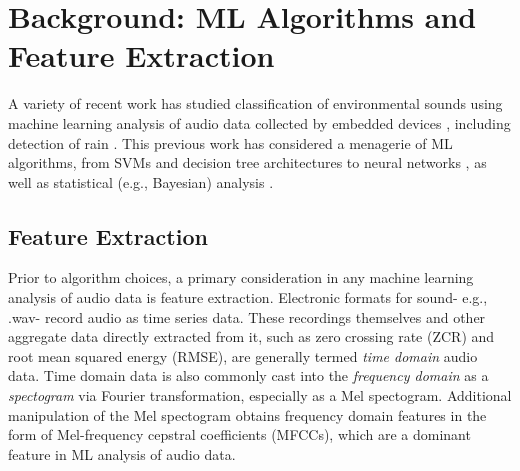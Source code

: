 \section{Background: ML Algorithms and Feature Extraction}

A variety of recent work has studied classification of environmental
sounds using machine learning analysis of audio data collected by
embedded devices \cite{electronics11223743,Mu2021,s22093504},
including detection of rain
\cite{quteprints82848,Ferroudj_et_al.,Guico_et_al.,Avanzato_et_al.}. This
previous work has considered a menagerie of ML algorithms, from SVMs and
decision tree architectures
\cite{s22093504,quteprints82848,Guico_et_al.}  to neural networks
\cite{Avanzato_et_al.,Mu2021}, as well as statistical (e.g., Bayesian)
analysis \cite{s22093504,Avanzato_et_al.}.

\subsection{Feature Extraction}
\label{relwork-features}

Prior to algorithm choices, a primary consideration in any machine
learning analysis of audio data is feature extraction. Electronic
formats for sound- e.g., .wav- record audio as time series data.
These recordings themselves and other aggregate data directly
extracted from it, such as zero crossing rate (ZCR) and root mean
squared energy (RMSE), are generally termed \emph{time domain} audio
data.  Time domain data is also commonly cast into the \emph{frequency
domain} as a \emph{spectogram} via Fourier transformation, especially as a Mel
spectogram. Additional manipulation of the Mel spectogram obtains
frequency domain features in the form of Mel-frequency cepstral
coefficients (MFCCs), which are a dominant feature in ML analysis of
audio data.

